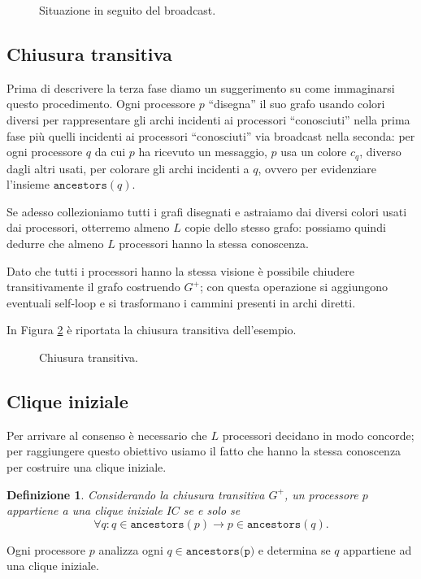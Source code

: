 \documentclass{article}
\newtheorem{definizione}{Definizione}
\begin{document}
\begin{figure}[!h]
  \centering \caption{Situazione in seguito
    del broadcast.}\label{fig:ampliamento}
\end{figure}

\subsection{Chiusura transitiva}
Prima di descrivere la terza fase diamo un suggerimento su come
immaginarsi questo procedimento. Ogni processore $p$ ``disegna'' il
suo grafo usando colori diversi per rappresentare gli archi incidenti
ai processori ``conosciuti'' nella prima fase più quelli incidenti ai
processori ``conosciuti'' via broadcast nella seconda: per ogni
processore $q$ da cui $p$ ha ricevuto un messaggio, $p$ usa un colore
$c_q$, diverso dagli altri usati, per colorare gli archi incidenti a
$q$, ovvero per evidenziare l'insieme $\texttt{ancestors}(q)$.

Se adesso collezioniamo tutti i grafi disegnati e astraiamo dai
diversi colori usati dai processori, otterremo almeno $L$ copie dello
stesso grafo: possiamo quindi dedurre che almeno $L$ processori hanno
la stessa conoscenza.

Dato che tutti i processori hanno la stessa visione è possibile
chiudere transitivamente il grafo costruendo $G^+$; con questa
operazione si aggiungono eventuali self-loop e si trasformano i
cammini presenti in archi diretti.

In Figura \ref{fig:chiusura} è riportata la chiusura transitiva
dell'esempio.

\begin{figure}[!h]
  \centering \caption{Chiusura transitiva.}\label{fig:chiusura}
\end{figure}

\subsection{Clique iniziale}
Per arrivare al consenso è necessario che $L$ processori decidano in
modo concorde; per raggiungere questo obiettivo usiamo il fatto che
hanno la stessa conoscenza per costruire una clique iniziale.
\begin{definizione}
  Considerando la chiusura transitiva $G^+$, un processore $p$
  appartiene a una clique iniziale $IC$ se e solo se $$\forall q:
  q\in\texttt{ancestors}(p)\rightarrow p\in\texttt{ancestors}(q).$$
\end{definizione} 
Ogni processore $p$ analizza ogni $q \in \texttt{ancestors(p)}$ e
determina se $q$ appartiene ad una clique iniziale.
\end{document}
